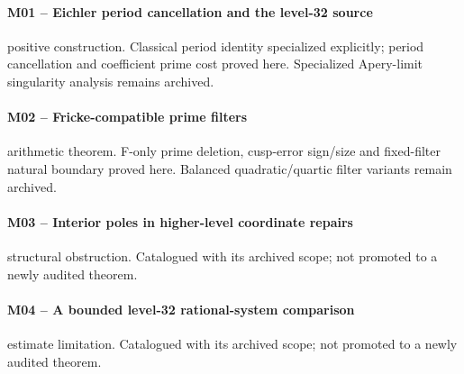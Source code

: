 \paragraph{M01 -- Eichler period cancellation and the level-32 source}\label{record-M01}
positive construction. Classical period identity specialized explicitly; period cancellation and coefficient prime cost proved here. Specialized Apery-limit singularity analysis remains archived.
\par\smallskip{}\par
\paragraph{M02 -- Fricke-compatible prime filters}\label{record-M02}
arithmetic theorem. F-only prime deletion, cusp-error sign/size and fixed-filter natural boundary proved here. Balanced quadratic/quartic filter variants remain archived.
\par\smallskip{}\par
\paragraph{M03 -- Interior poles in higher-level coordinate repairs}\label{record-M03}
structural obstruction. Catalogued with its archived scope; not promoted to a newly audited theorem.
\par\smallskip{}\par
\paragraph{M04 -- A bounded level-32 rational-system comparison}\label{record-M04}
estimate limitation. Catalogued with its archived scope; not promoted to a newly audited theorem.
\par\smallskip{}\par
